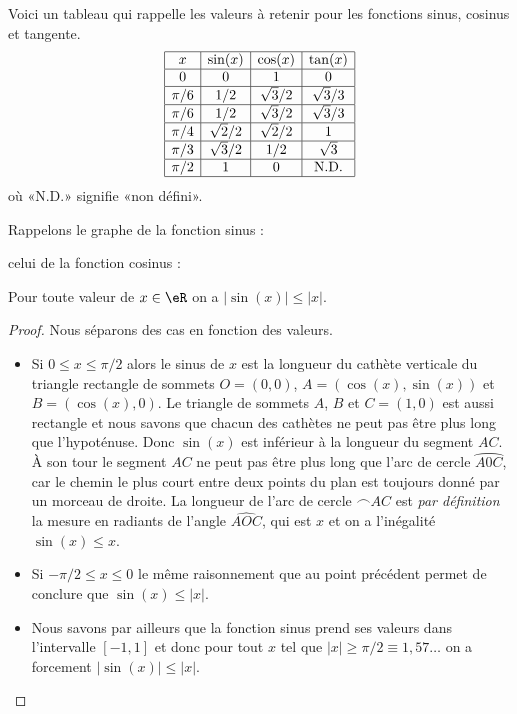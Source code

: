 Voici un tableau qui rappelle les valeurs à retenir pour les fonctions sinus, cosinus et tangente.\label{PGooIMQFooTnBdIl}
\begin{equation*}
    \begin{array}[]{|c|c|c|c|}
      \hline
      x&\sin(x)&\cos(x)&\tan(x)\\
      \hline
      0&0&1&0\\
      \hline
      \pi/6&1/2&\sqrt{3}/2&\sqrt{3}/3\\
      \hline
      \pi/6&1/2&\sqrt{3}/2&\sqrt{3}/3\\
      \hline
      \pi/4&\sqrt{2}/2&\sqrt{2}/2&1\\
      \hline
      \pi/3&\sqrt{3}/2&1/2&\sqrt{3}\\
      \hline
      \pi/2&1&0&\text{N.D.}\\
      \hline
    \end{array}
\end{equation*}
où «N.D.»  signifie «non défini».

Rappelons le graphe de la fonction sinus :
\begin{center}
   
\end{center}
celui de la fonction cosinus :
\begin{center}
   
\end{center}


\begin{lemma}
  Pour toute valeur de $x\in \eR$ on a $|\sin(x)|\leq |x|$. 
\end{lemma}

\begin{proof}
        Nous séparons des cas en fonction des valeurs.
    \begin{itemize}
    \item Si $0\leq x\leq \pi/2$ alors le sinus de $x$ est la longueur du cathète verticale du triangle rectangle de sommets $O = (0,0)$, $A = (\cos(x), \sin(x))$ et $B = (\cos(x), 0)$. Le triangle de sommets $A$, $B$ et $C = (1, 0)$ est aussi rectangle et nous savons que chacun des cathètes ne peut pas être plus long que l'hypoténuse. Donc $\sin(x)$ est inférieur à la longueur du segment $AC$. À son tour le segment $AC$ ne peut pas être plus long que l'arc de cercle $\wideparen{A0C}$, car le chemin le plus court entre deux points du plan est toujours donné par un morceau de droite. La longueur de l'arc de cercle $\frown{AC}$ est \emph{par définition} la mesure en radiants de l'angle $\widehat{AOC}$, qui est $x$ et on a l'inégalité $\sin(x)\leq x$. 
    \item Si $-\pi/2\leq x\leq 0$ le m\^eme raisonnement que au point précédent permet de conclure que $\sin(x)\leq |x|$.
    \item Nous savons par ailleurs que la fonction sinus prend ses valeurs dans l'intervalle $[-1,1]$ et donc pour tout $x$ tel que $|x|\geq \pi/2 \equiv 1,57\ldots$ on a forcement $|\sin(x)|\leq |x|$.  
    \end{itemize}
\end{proof}

